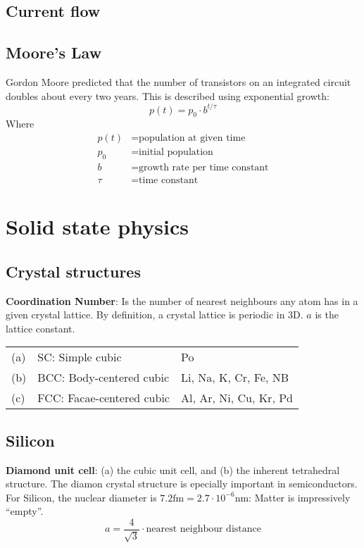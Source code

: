 \documentclass[a4paper, fontsize=8pt, landscape, DIV=1]{scrartcl}
\begin{document}
\begin{multicols*}{4}
    \subsection{Current flow}
    
    \subsection{Moore's Law}
    Gordon Moore predicted that the number of transistors on an integrated circuit doubles about every two years. This is described using exponential growth:
    \[p(t) = p_0 \cdot b^{t/\tau}\]
    Where
    \begin{align*}
      p(t) &= \text{population at given time} \\
      p_0 &= \text{initial population} \\
      b &= \text{growth rate per time constant} \\
      \tau &= \text{time constant}
    \end{align*}

  \section{Solid state physics}
  \subsection{Crystal structures}
  \textbf{Coordination Number}: Is the number of nearest neighbours any atom has in a given crystal lattice. By definition, a crystal lattice is periodic in 3D. $a$ is the lattice constant.

  \begin{tabular}[h]{l l p{1.5cm}}
    (a) & SC: Simple cubic & Po \\
    (b) & BCC: Body-centered cubic & Li, Na, K, Cr, Fe, NB \\
    (c) & FCC: Facae-centered cubic & Al, Ar, Ni, Cu, Kr, Pd \\
  \end{tabular}

  \subsection{Silicon}
  \textbf{Diamond unit cell}: (a) the cubic unit cell, and (b) the inherent tetrahedral structure. The diamon crystal structure is epecially important in semiconductors. For Silicon, the nuclear diameter is $7.2\text{fm} = 2.7\cdot 10^{-6}\text{nm}$: Matter is impressively ``empty''.
  \[a = \frac{4}{\sqrt{3}}  \cdot \text{nearest neighbour distance} \]
  

\end{multicols*}
\end{document}
